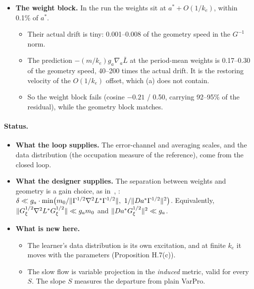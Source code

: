 \begin{itemize}
\begin{itemize}
    \end{itemize}
  \item \textbf{The weight block.} In the  run the weights sit at $a^* + O(1/k_e)$, within 0.1\% of
    $a^*$.
    \begin{itemize}
      \item Their actual drift is tiny: 0.001--0.008 of the geometry speed in the $G^{-1}$ norm.
      \item The prediction $-(m/k_e)g_a\nabla_a\bar L$ at the period-mean weights is 0.17--0.30 of the geometry speed,
        40--200 times the actual drift. It is the restoring velocity of the $O(1/k_e)$ offset, which (a) does not
        contain.
      \item So the weight block fails (cosine $-0.21$ / 0.50, carrying 92--95\% of the residual), while the geometry
        block matches.
    \end{itemize}
\end{itemize}

\paragraph{Status.}
\begin{itemize}
  \item \textbf{What the loop supplies.} The error-channel and averaging scales, and the data distribution (the
    occupation measure of the reference), come from the closed loop.
  \item \textbf{What the designer supplies.} The separation between weights and geometry is a gain choice, as
    in~\cite{S1}, \cite{S2}:
    $\delta \ll g_a\cdot\min\bigl(m_0/\lVert \Gamma^{1/2}\nabla^2L^*\Gamma^{1/2}\rVert,\
    1/\lVert Da^*\Gamma^{1/2}\rVert^2\bigr)$. Equivalently, $\lVert G_\xi^{1/2}\nabla^2L^*G_\xi^{1/2}\rVert \ll g_a m_0$ and
    $\lVert Da^*G_\xi^{1/2}\rVert^2 \ll g_a$.
  \item \textbf{What is new here.}
    \begin{itemize}
      \item The learner's data distribution is its own excitation, and at finite $k_e$ it moves with the parameters
        (Proposition H.7(c)).
      \item The slow flow is variable projection in the \emph{induced} metric, valid for every $S$. The slope $S$
        measures the departure from plain VarPro.
    \end{itemize}
\end{itemize}
